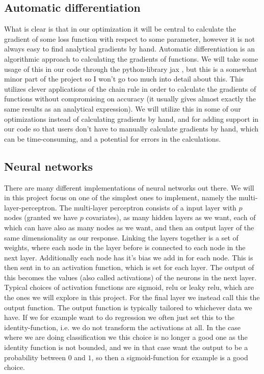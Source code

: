 \documentclass{article}
\begin{document}
\subsection{Automatic differentiation}
What is clear is that in our optimization it will be central to calculate the
gradient of some loss function with respect to some parameter, however it is not
always easy to find analytical gradients by hand. Automatic differentiation is
an algorithmic approach to calculating the gradients of functions. We will take
some usage of this in our code through the python-library jax
\cite{githubrepojax}, but this is a somewhat minor part of the project so I
won't go too much into detail about this. This utilizes clever applications of
the chain rule in order to calculate the gradients of functions without
compromising on accuracy (it usually gives almost exactly the same results as an
analytical expression).  We will utilize this in some of our optimizations
instead of calculating gradients by hand, and for adding support in our code so
that users don't have to manually calculate gradients by hand, which can be
time-consuming, and a potential for errors in the calculations.

\subsection{Neural networks}
There are many different implementations of neural networks out there. We will
in this project focus on one of the simplest ones to implement, namely the
multi-layer-perceptron. The multi-layer perceptron consists of a input layer
with $p$ nodes (granted we have $p$ covariates), as many hidden layers as we
want, each of which can have also as many nodes as we want, and then an output
layer of the same dimensionality as our response. Linking the layers together is
a set of weights, where each node in the layer before is connected to each node
in the next layer. Additionally each node has it's bias we add in for each node.
This is then sent in to an activation function, which is set for each layer. The
output of this becomes the values (also called activations) of the neurons in
the next layer. Typical choices of activation functions are sigmoid, relu or
leaky relu, which are the ones we will explore in this project. For the final
layer we instead call this the output function. The output function is typically
tailored to whichever data we have. If we for example want to do regression we
often just set this to the identity-function, i.e. we do not transform the
activations at all. In the case where we are doing classification we this choice
is no longer a good one as the identity function is not bounded, and we in that
case want the output to be a probability between $0$ and $1$, so then a
sigmoid-function for example is a good choice.
\end{document}
